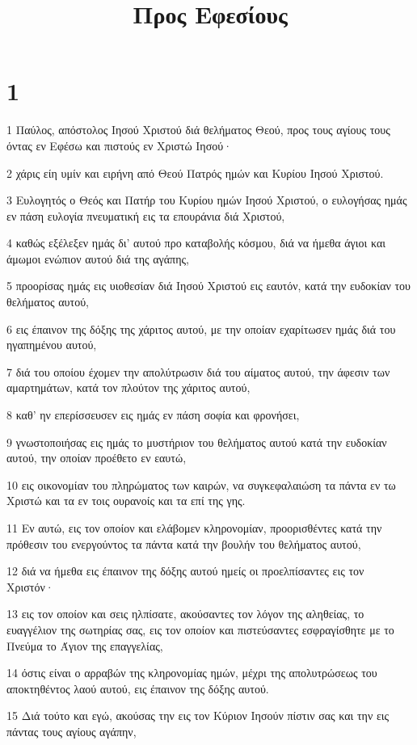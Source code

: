 

\title{Προς Εφεσίους}


\chapter{1}

\par 1 Παύλος, απόστολος Ιησού Χριστού διά θελήματος Θεού, προς τους αγίους τους όντας εν Εφέσω και πιστούς εν Χριστώ Ιησού·
\par 2 χάρις είη υμίν και ειρήνη από Θεού Πατρός ημών και Κυρίου Ιησού Χριστού.
\par 3 Ευλογητός ο Θεός και Πατήρ του Κυρίου ημών Ιησού Χριστού, ο ευλογήσας ημάς εν πάση ευλογία πνευματική εις τα επουράνια διά Χριστού,
\par 4 καθώς εξέλεξεν ημάς δι' αυτού προ καταβολής κόσμου, διά να ήμεθα άγιοι και άμωμοι ενώπιον αυτού διά της αγάπης,
\par 5 προορίσας ημάς εις υιοθεσίαν διά Ιησού Χριστού εις εαυτόν, κατά την ευδοκίαν του θελήματος αυτού,
\par 6 εις έπαινον της δόξης της χάριτος αυτού, με την οποίαν εχαρίτωσεν ημάς διά του ηγαπημένου αυτού,
\par 7 διά του οποίου έχομεν την απολύτρωσιν διά του αίματος αυτού, την άφεσιν των αμαρτημάτων, κατά τον πλούτον της χάριτος αυτού,
\par 8 καθ' ην επερίσσευσεν εις ημάς εν πάση σοφία και φρονήσει,
\par 9 γνωστοποιήσας εις ημάς το μυστήριον του θελήματος αυτού κατά την ευδοκίαν αυτού, την οποίαν προέθετο εν εαυτώ,
\par 10 εις οικονομίαν του πληρώματος των καιρών, να συγκεφαλαιώση τα πάντα εν τω Χριστώ και τα εν τοις ουρανοίς και τα επί της γης.
\par 11 Εν αυτώ, εις τον οποίον και ελάβομεν κληρονομίαν, προορισθέντες κατά την πρόθεσιν του ενεργούντος τα πάντα κατά την βουλήν του θελήματος αυτού,
\par 12 διά να ήμεθα εις έπαινον της δόξης αυτού ημείς οι προελπίσαντες εις τον Χριστόν·
\par 13 εις τον οποίον και σεις ηλπίσατε, ακούσαντες τον λόγον της αληθείας, το ευαγγέλιον της σωτηρίας σας, εις τον οποίον και πιστεύσαντες εσφραγίσθητε με το Πνεύμα το Άγιον της επαγγελίας,
\par 14 όστις είναι ο αρραβών της κληρονομίας ημών, μέχρι της απολυτρώσεως του αποκτηθέντος λαού αυτού, εις έπαινον της δόξης αυτού.
\par 15 Διά τούτο και εγώ, ακούσας την εις τον Κύριον Ιησούν πίστιν σας και την εις πάντας τους αγίους αγάπην,
